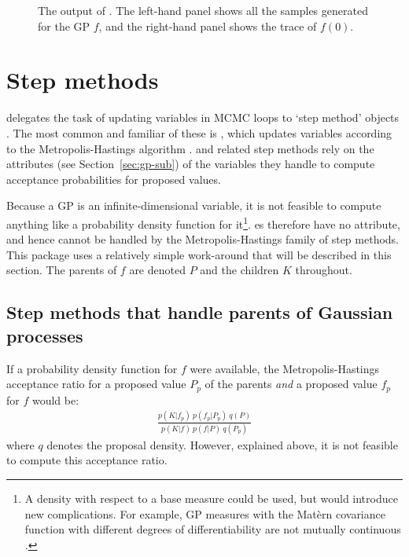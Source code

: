 \documentclass[article]{jss}
\begin{document}
\begin{figure}
    \centering
    \caption{The output of . The left-hand panel shows all the samples generated for the GP $f$, and the right-hand panel shows the trace of $f(0)$.}
    \label{fig:MCMCOutput}
\end{figure}
 

\section{Step methods}
\label{sec:step-methods}
 delegates the task of updating variables in MCMC loops to `step method' objects \citep{pymc}. The most common and familiar of these is , which updates variables according to the Metropolis-Hastings algorithm \citep{metropolis}.  and related step methods rely on the  attributes (see Section~\ref{sec:gp-sub}) of the variables they handle to compute acceptance probabilities for proposed values. 

Because a GP is an infinite-dimensional variable, it is not feasible to compute anything like a probability density function for it\footnote{A density with respect to a base measure could be used, but would introduce new complications. For example, GP measures with the Mat\`ern covariance function with different degrees of differentiability are not mutually continuous \citep{something}.}. es therefore have no  attribute, and hence cannot be handled by the Metropolis-Hastings family of step methods. This package uses a relatively simple work-around that will be described in this section. The parents of $f$ are denoted $P$ and the children $K$ throughout.


\subsection{Step methods that handle parents of Gaussian processes}
If a probability density function for $f$ were available, the Metropolis-Hastings acceptance ratio for a proposed value $P_p$ of the parents \emph{and} a proposed value $f_p$ for $f$ would be:
\begin{eqnarray*}
    \frac{p(K|f_p)\ p(f_p|P_p)\ q(P)}{p(K|f)\ p(f|P)\ q(P_p)}
\end{eqnarray*}
where $q$ denotes the proposal density. However, explained above, it is not feasible to compute this acceptance ratio.
\end{document}

